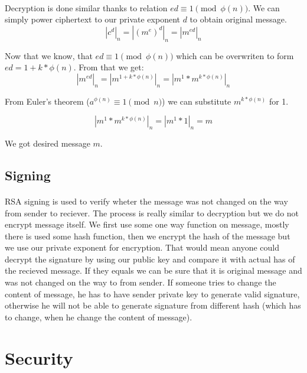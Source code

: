 \documentclass[thesis=B,english]{FITthesis}[2012/10/20]
\begin{document}
\paragraph*{}
{Decryption is done similar thanks to relation \(ed \equiv 1 \pmod{\phi(n)}\). We can simply power ciphertext to our private exponent \(d\) to obtain original message.  
\[ |c^d|_n = |(m^e)^d|_n = | m^{ed}|_n \]

Now that we know, that \(ed \equiv 1 \pmod{\phi(n)}\) which can be overwriten to form \(ed = 1 + k*\phi(n)\). From that we get:
\[| m^{ed}|_n = | m^{1+ k*\phi(n) }|_n = | m^1 * m^{ k*\phi(n)}|_n\]

From Euler's theorem (\(a^{\phi(n)} \equiv 1 \pmod{n}\)) we can substitute \(m^{ k*\phi(n)}\) for 1.


\[| m^1 * m^{ k*\phi(n)}|_n = | m^1 * 1|_n =  m\]

We got desired message \(m\). 
}

\subsection{Signing}
\paragraph*{}{
RSA signing is used to verify wheter the message was not changed on the way from sender to reciever. The process is really similar to decryption but we do not encrypt message itself. We first use some one way function on message, mostly there is used some hash function, then we encrypt the hash of the message but we use our private exponent for encryption. That would mean anyone could decrypt the signature by using our public key and compare it with actual has of the recieved message. If they equals we can be sure that it is original message and was not changed on the way to from sender. If someone tries to change the content of message, he has to have sender private key to generate valid signature, otherwise he will not be able to generate signature from different hash (which has to change, when he change the content of message).

}
\section{Security}
\end{document}

